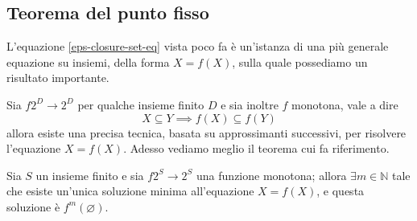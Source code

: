 \documentclass[class=book, crop=false, oneside, 12pt]{standalone}
\begin{document}
\subsection{Teorema del punto fisso}
L'equazione \ref{eps-closure-set-eq} vista poco fa è un'istanza di una più generale equazione su insiemi, della forma \(X = f(X)\), sulla quale possediamo un risultato importante.


Sia \(f 2^D \to 2^D\) per qualche insieme finito \(D\) e sia inoltre \( f \) monotona, vale a dire
\begin{equation*}
    X \subseteq Y \implies f(X) \subseteq f(Y)
\end{equation*}
allora esiste una precisa tecnica, basata su approssimanti successivi, per risolvere l'equazione \(X = f(X)\). Adesso vediamo meglio il teorema cui fa riferimento.

\begin{theorem}
    Sia \(S\) un insieme finito e sia \(f 2^S \to 2^S\) una funzione monotona; allora \(\exists m \in \mathbb{N}\) tale che esiste un'unica soluzione minima all'equazione \(X = f(X)\), e questa soluzione è \(f^m(\varnothing)\).
\end{theorem}
\end{document}
